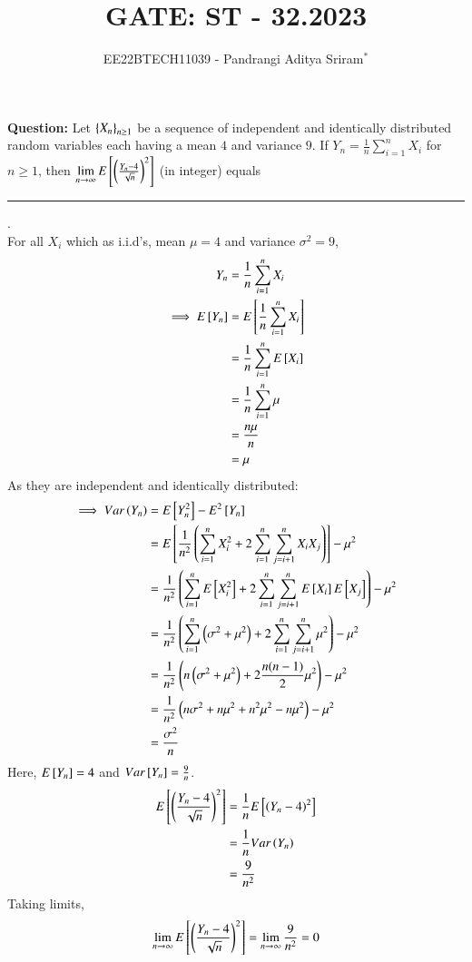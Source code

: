 \documentclass[journal,12pt,onecolumn]{IEEEtran}
\theoremstyle{remark}
\begin{document}

\vspace{3cm}

\title{GATE: ST - 32.2023}
\author{EE22BTECH11039 - Pandrangi Aditya Sriram$^{*}$%
}
\maketitle
\bigskip

\renewcommand{\thefigure}{\theenumi}
\renewcommand{\thetable}{\theenumi}


\vspace{3cm}
\textbf{Question:} Let $\left\{X_n\right\}_{n \geq 1}$ be a sequence of independent and identically distributed random variables each having a mean $4$ and variance $9$. If $Y_n = \frac{1}{n} \sum_{i=1}^{n} X_i$ for $n \geq 1$, then $\lim\limits_{n \to \infty} E{}\left[\left(\frac{Y_n - 4}{\sqrt{n}}\right)^2\right]$ (in integer) equals \rule{2cm}{0.1mm}.
\\
\solution
For all $X_i$ which as i.i.d's, mean $\mu = 4$ and variance $\sigma^2 = 9$,
\begin{align}
    Y_n &= \frac{1}{n} \sum_{i=1}^{n} X_i\\
    \implies E{}\left[Y_n\right] &= E{}\left[\frac{1}{n} \sum_{i=1}^{n} X_i\right]\\
    &= \frac{1}{n} \sum_{i=1}^{n} E{}\left[X_i\right]\\
    &= \frac{1}{n} \sum_{i=1}^{n} \mu\\
    &= \frac{n\mu}{n}\\
    &= \mu
\end{align}
As they are independent and identically distributed:
\begin{align}
    \implies Var\left(Y_n\right) &= E{}\left[Y_n^2\right] - E^2{}\left[Y_n\right]\\
    &= E{}\left[\frac{1}{n^2} \left(\sum_{i=1}^{n} X_i^2 + 2\sum_{i=1}^{n}\sum_{j=i+1}^{n} X_i X_j\right)\right] - \mu^2\\
    &= \frac{1}{n^2} \left(\sum_{i=1}^{n} E{}\left[X_i^2\right] + 2\sum_{i=1}^{n}\sum_{j=i+1}^{n} E{}\left[X_i\right] E{}\left[X_j\right]\right) - \mu^2\\
    &= \frac{1}{n^2} \left(\sum_{i=1}^{n} \left(\sigma^2 + \mu^2\right) + 2\sum_{i=1}^{n}\sum_{j=i+1}^{n} \mu^2\right) - \mu^2\\
    &= \frac{1}{n^2} \left(n\left(\sigma^2 + \mu^2\right) + 2 \frac{n(n-1)}{2} \mu^2\right) - \mu^2\\
    &= \frac{1}{n^2} \left(n\sigma^2 + n\mu^2 + n^2 \mu^2 - n \mu^2\right) - \mu^2\\
    &= \frac{\sigma^2}{n} 
\end{align}
Here, $E{}\left[Y_n\right] = 4$ and $Var{}\left[Y_n\right] = \frac{9}{n}$. 
\begin{align}
    E{}\left[\left(\frac{Y_n - 4}{\sqrt{n}}\right)^2\right] &= \frac{1}{n} E{}\left[\left({Y_n - 4}\right)^2\right]\\
    &= \frac{1}{n} Var\left(Y_n\right)\\
    &= \frac{9}{n^2}
\end{align}
Taking limits,
\begin{align}
    \lim\limits_{n \to \infty} E{}\left[\left(\frac{Y_n - 4}{\sqrt{n}}\right)^2\right]
    = \lim\limits_{n \to \infty} \frac{9}{n^2} = 0
\end{align}
\end{document}
